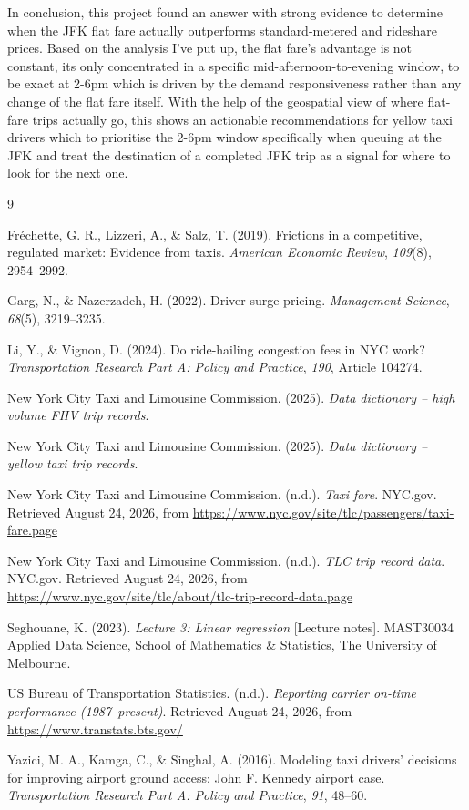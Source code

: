 \documentclass[11pt]{article}
\begin{document}
In conclusion, this project found an answer with strong evidence to determine when
the JFK flat fare actually outperforms standard-metered and rideshare prices. Based
on the analysis I've put up, the flat fare's advantage is not constant, its only
concentrated in a specific mid-afternoon-to-evening window, to be exact at 2-6pm
which is driven by the demand responsiveness rather than any change of the flat fare
itself. With the help of the geospatial view of where flat-fare trips actually go,
this shows an actionable recommendations for yellow taxi drivers which to prioritise
the 2-6pm window specifically when queuing at the JFK and treat the destination of a
completed JFK trip as a signal for where to look for the next one.

\begin{thebibliography}{9}

Fr\'echette, G. R., Lizzeri, A., \& Salz, T. (2019). Frictions in a competitive,
regulated market: Evidence from taxis. \textit{American Economic Review}, \textit{109}(8),
2954--2992.

Garg, N., \& Nazerzadeh, H. (2022). Driver surge pricing. \textit{Management Science},
\textit{68}(5), 3219--3235.

Li, Y., \& Vignon, D. (2024). Do ride-hailing congestion fees in NYC work?
\textit{Transportation Research Part A: Policy and Practice}, \textit{190}, Article
104274.

New York City Taxi and Limousine Commission. (2025). \textit{Data dictionary -- high
volume FHV trip records}.

New York City Taxi and Limousine Commission. (2025). \textit{Data dictionary -- yellow
taxi trip records}.

New York City Taxi and Limousine Commission. (n.d.). \textit{Taxi fare}. NYC.gov.
Retrieved August 24, 2026, from
\url{https://www.nyc.gov/site/tlc/passengers/taxi-fare.page}

New York City Taxi and Limousine Commission. (n.d.). \textit{TLC trip record data}.
NYC.gov. Retrieved August 24, 2026, from
\url{https://www.nyc.gov/site/tlc/about/tlc-trip-record-data.page}

Seghouane, K. (2023). \textit{Lecture 3: Linear regression} [Lecture notes]. MAST30034
Applied Data Science, School of Mathematics \& Statistics, The University of
Melbourne.

US Bureau of Transportation Statistics. (n.d.). \textit{Reporting carrier on-time
performance (1987--present)}. Retrieved August 24, 2026, from
\url{https://www.transtats.bts.gov/}

Yazici, M. A., Kamga, C., \& Singhal, A. (2016). Modeling taxi drivers' decisions for
improving airport ground access: John F. Kennedy airport case. \textit{Transportation
Research Part A: Policy and Practice}, \textit{91}, 48--60.

\end{thebibliography}
\end{document}

